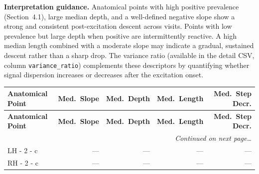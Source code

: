\documentclass[a4paper,11pt]{article}
\begin{document}
\medskip
\noindent\textbf{Interpretation guidance.}
Anatomical points with high positive prevalence (Section~4.1), large median depth, and a
well-defined negative slope show a strong and consistent post-excitation descent across
visits.
Points with low prevalence but large depth when positive are intermittently reactive.
A high median length combined with a moderate slope may indicate a gradual, sustained
descent rather than a sharp drop.
The variance ratio (available in the detail CSV, column \texttt{variance\_ratio}) complements
these descriptors by quantifying whether signal dispersion increases or decreases after the
excitation onset.

\begin{small}
\begin{longtable}{p{4.5cm}rrrr}
\toprule
\textbf{Anatomical Point} &
\textbf{Med.\ Slope} &
\textbf{Med.\ Depth} &
\textbf{Med.\ Length} &
\textbf{Med.\ Step Decr.} \\
\midrule
\endfirsthead
\toprule
\textbf{Anatomical Point} &
\textbf{Med.\ Slope} &
\textbf{Med.\ Depth} &
\textbf{Med.\ Length} &
\textbf{Med.\ Step Decr.} \\
\midrule
\endhead
\midrule
\multicolumn{5}{r}{\small\emph{Continued on next page\ldots}} \\
\endfoot
\bottomrule
\endlastfoot
LH - 2 - c & --- & --- & --- & --- \\
RH - 2 - c & --- & --- & --- & --- \\
\end{longtable}
\end{small}
\end{document}
